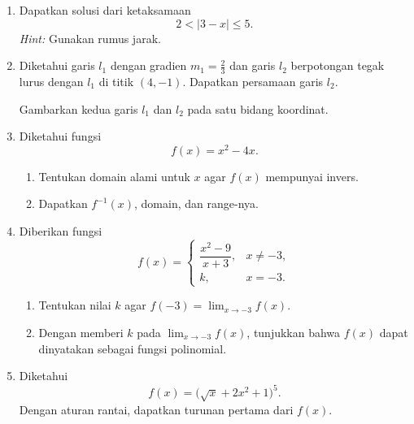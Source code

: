 \documentclass[10pt,letterpaper]{article}
\begin{document}
\begin{enumerate}

  \item Dapatkan solusi dari ketaksamaan
        \[
          2<|3-x|\le5.
        \]
        \textit{Hint:} Gunakan rumus jarak.

  \item Diketahui garis $l_1$ dengan gradien $m_1=\frac23$ dan garis $l_2$
        berpotongan tegak lurus dengan $l_1$ di titik $(4,-1)$.
        Dapatkan persamaan garis $l_2$.

        Gambarkan kedua garis $l_1$ dan $l_2$ pada satu bidang koordinat.

  \item Diketahui fungsi
        \[
          f(x)=x^2-4x.
        \]
        \begin{enumerate}
          \item Tentukan domain alami untuk $x$ agar $f(x)$ mempunyai invers.
          \item Dapatkan $f^{-1}(x)$, domain, dan range-nya.
        \end{enumerate}

  \item Diberikan fungsi
        \[
          f(x)=
          \begin{cases}
            \dfrac{x^2-9}{x+3}, & x\ne-3, \\[5pt]
            k,                  & x=-3.
          \end{cases}
        \]
        \begin{enumerate}
          \item Tentukan nilai $k$ agar $f(-3)=\lim_{x\to-3}f(x)$.
          \item Dengan memberi $k$ pada $\lim_{x\to-3}f(x)$, tunjukkan bahwa
                $f(x)$ dapat dinyatakan sebagai fungsi polinomial.
        \end{enumerate}

  \item Diketahui
        \[
          f(x)=\bigl(\sqrt{x}+2x^2+1\bigr)^5.
        \]
        Dengan aturan rantai, dapatkan turunan pertama dari $f(x)$.

\end{enumerate}
\end{document}
